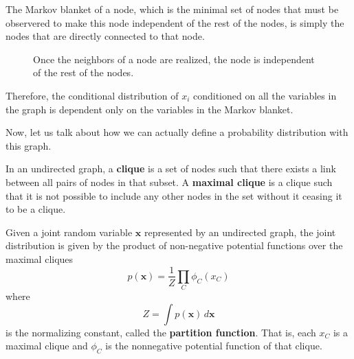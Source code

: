   \begin{definition}
    The Markov blanket of a node, which is the minimal set of nodes that must be observered to make this node independent of the rest of the nodes, is simply the nodes that are directly connected to that node. 

    \begin{figure}[H]
      \centering 
      \caption{Once the neighbors of a node are realized, the node is independent of the rest of the nodes. } 
      \label{fig:markov_blanket_undirected}
    \end{figure}

    Therefore, the conditional distribution of $x_i$ conditioned on all the variables in the graph is dependent only on the variables in the Markov blanket. 
  \end{definition}

  Now, let us talk about how we can actually define a probability distribution with this graph. 

  \begin{definition}[Clique] 
    In an undirected graph, a \textbf{clique} is a set of nodes such that there exists a link between all pairs of nodes in that subset. A \textbf{maximal clique} is a clique such that it is not possible to include any other nodes in the set without it ceasing it to be a clique. 
  \end{definition}

  Given a joint random variable $\mathbf{x}$  represented by an undirected graph, the joint distribution is given by the product of non-negative potential functions over the maximal cliques 
  \begin{equation}
    p(\mathbf{x}) = \frac{1}{Z} \prod_C \phi_C (x_C)
  \end{equation}
  where 
  \begin{equation}
    Z = \int p(\mathbf{x}) \,d\mathbf{x}
  \end{equation}
  is the normalizing constant, called the \textbf{partition function}. That is, each $x_C$ is a maximal clique and $\phi_C$ is the nonnegative potential function of that clique. 

